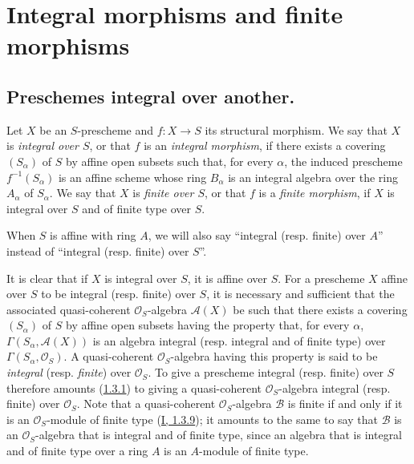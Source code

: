 \section{Integral morphisms and finite morphisms}
\label{section:II.6}

\subsection{Preschemes integral over another.}
\label{subsection:II.6.1}

\begin{definition}[6.1.1]
\label{II.6.1.1}
Let $X$ be an $S$-prescheme and $f:X\to S$ its structural morphism. We say
that $X$ is \emph{integral over $S$}, or that $f$ is an \emph{integral
morphism}, if there exists a covering $(S_\alpha)$ of $S$ by affine open
subsets such that, for every $\alpha$, the induced prescheme
$f^{-1}(S_\alpha)$ is an affine scheme whose ring $B_\alpha$ is an integral
algebra over the ring $A_\alpha$ of $S_\alpha$. We say that $X$ is
\emph{finite over $S$}, or that $f$ is a \emph{finite morphism}, if $X$ is
integral over $S$ and of finite type over $S$.
\end{definition}

When $S$ is affine with ring $A$, we will also say ``integral (resp. finite)
over $A$'' instead of ``integral (resp. finite) over $S$''.

\begin{env}[6.1.2]
\label{II.6.1.2}
It is clear that if $X$ is integral over $S$, it is affine over $S$. For a
prescheme $X$ affine over $S$ to be integral (resp. finite) over $S$, it is
necessary and sufficient that the associated quasi-coherent
$\mathcal{O}_S$-algebra $\mathcal{A}(X)$ be such that there exists a
covering $(S_\alpha)$ of $S$ by affine open subsets having the property that,
for every $\alpha$, $\Gamma(S_\alpha,\mathcal{A}(X))$ is an algebra integral
(resp. integral and of finite type) over
$\Gamma(S_\alpha,\mathcal{O}_S)$. A quasi-coherent $\mathcal{O}_S$-algebra
having this property is said to be \emph{integral} (resp. \emph{finite}) over
$\mathcal{O}_S$. To give a prescheme integral (resp. finite) over $S$
therefore amounts (\hyperref[II.1.3.1]{1.3.1}) to giving a
quasi-coherent $\mathcal{O}_S$-algebra integral (resp. finite) over
$\mathcal{O}_S$. Note that a quasi-coherent $\mathcal{O}_S$-algebra
$\mathcal{B}$ is finite if and only if it is an $\mathcal{O}_S$-module of
finite type (\hyperref[I.1.3.9]{I, 1.3.9}); it amounts to the same to say
that $\mathcal{B}$ is an $\mathcal{O}_S$-algebra that is integral and of
finite type, since an algebra that is integral and of finite type over a
ring $A$ is an $A$-module of finite type.
\end{env}

